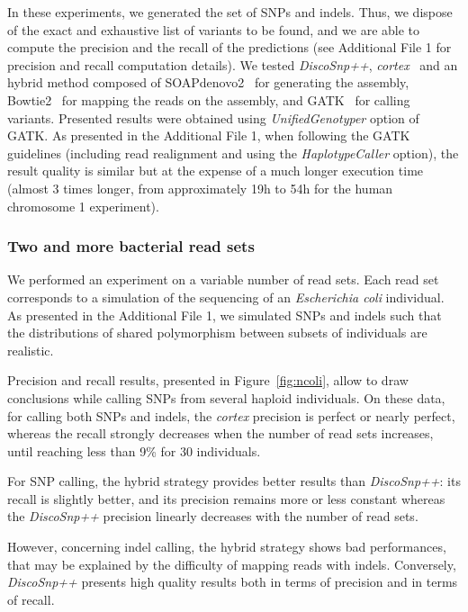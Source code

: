 \documentclass{bmcart}
\newcommand{\discopp}{{\it DiscoSnp++}\xspace}
\newcommand{\co}{{\it cortex}\xspace}
\begin{document}
In these experiments, we generated the set of SNPs and indels. 
Thus, we dispose of the exact and exhaustive list of variants to be found, and we are able to compute the precision and the recall of the predictions (see Additional File 1 for precision and recall computation details). We tested \discopp, \co~\cite{iqbal2012novo} and an hybrid method composed of SOAPdenovo2~\cite{luo2012soapdenovo2} for generating the assembly, Bowtie2~\cite{langmead2012fast} for mapping the reads on the assembly, and GATK~\cite{gatk} for calling variants. Presented results were obtained using \emph{UnifiedGenotyper} option of GATK. As presented in the Additional File 1, when following the GATK guidelines (including read realignment and using the \emph{HaplotypeCaller} option), the result quality is similar but at the expense of a much longer execution time (almost 3 times longer, from approximately 19h to 54h for the human chromosome 1 experiment). 

\subsubsection*{Two and more bacterial read sets}
We performed an experiment on a variable number of read sets. Each read set corresponds to a simulation of the sequencing of an \emph{Escherichia coli} individual. As presented in the Additional File 1, we simulated SNPs and indels such that the distributions of shared polymorphism between subsets of individuals are realistic. 

Precision and recall results, presented in Figure~\ref{fig:ncoli}, allow to draw conclusions while calling SNPs from several haploid individuals. 
On these data, for calling both SNPs and indels, the \co precision is perfect or nearly perfect, whereas the recall strongly decreases when the number of read sets increases, until reaching less than 9\% for 30 individuals. 

For SNP calling, the hybrid strategy provides better results than \discopp: its recall is slightly better, and its precision remains more or less constant whereas the \discopp precision linearly decreases with the number of read sets. 

However, concerning indel calling, the hybrid strategy shows bad performances, that may be explained by the difficulty of mapping reads with indels. Conversely, \discopp presents high quality results both in terms of precision and in terms of recall. 
\end{document}
